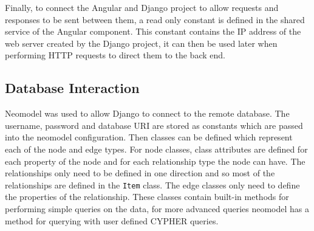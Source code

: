 Finally, to connect the Angular and Django project to allow requests and responses to be sent between them, a read only constant is defined 
in the shared service of the Angular component. This constant contains the IP address of the web server created by the Django project, it can then 
be used later when performing HTTP requests to direct them to the back end.
\subsection{Database Interaction}
Neomodel was used to allow Django to connect to the remote database. The username, password and database URI are stored as 
constants which are passed into the neomodel configuration. Then classes can be defined which represent each of the node and edge types.
For node classes, class attributes are defined for each property of the node and for each relationship type the node can have. The relationships 
only need to be defined in one direction and so most of the relationships are defined in the \verb|Item| class. The edge classes only need to 
define the properties of the relationship. These classes contain built-in methods for performing simple queries on the data, for more 
advanced queries neomodel has a method for querying with user defined CYPHER queries.
